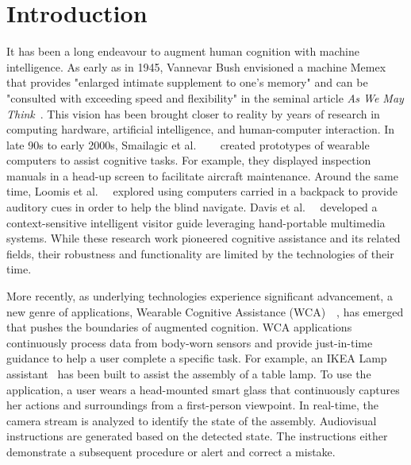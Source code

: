 \chapter{Introduction}
\label{chapter: intro}

It has been a long endeavour to augment human cognition with machine
intelligence. As early as in 1945, Vannevar Bush envisioned a machine Memex that
provides "enlarged intimate supplement to one's memory" and can be "consulted
with exceeding speed and flexibility" in the seminal article \textit{As We May
Think}~\cite{bush1945we}. This vision has been brought closer to reality by
years of research in computing hardware, artificial intelligence, and
human-computer interaction. In late 90s to early 2000s, Smailagic et al.
~\cite{smailagic1993case}~\cite{smailagic1998very}~\cite{smailagic2002application}
created prototypes of wearable computers to assist cognitive tasks. For example,
they displayed inspection manuals in a head-up screen to facilitate aircraft
maintenance. Around the same time, Loomis et
al.~\cite{loomis1998navigation}~\cite{loomis1994personal} explored using
computers carried in a backpack to provide auditory cues in order to help the
blind navigate.  Davis et
al.~\cite{davies1998developing}~\cite{cheverst2000developing} developed a
context-sensitive intelligent visitor guide leveraging hand-portable multimedia
systems. While these research work pioneered cognitive assistance and its
related fields, their robustness and functionality are limited by the
technologies of their time.

More recently, as underlying technologies experience significant advancement, a
new genre of applications, Wearable Cognitive Assistance
(WCA)~\cite{ha2014towards}~\cite{chen2018application}, has emerged that pushes
the boundaries of augmented cognition. WCA applications continuously process
data from body-worn sensors and provide just-in-time guidance to help a user
complete a specific task. For example, an IKEA Lamp
assistant~\cite{chen2018application} has been built to assist the assembly of a
table lamp. To use the application, a user wears a head-mounted smart glass that
continuously captures her actions and surroundings from a first-person
viewpoint. In real-time, the camera stream is analyzed to identify the state of
the assembly. Audiovisual instructions are generated based on the detected
state. The instructions either demonstrate a subsequent procedure or alert and
correct a mistake.

